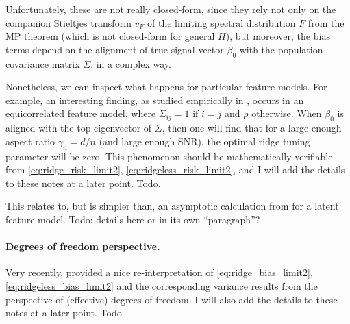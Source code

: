 \documentclass{article}
\begin{document}
Unfortunately, these are not really closed-form, since they rely not only on the
companion Stieltjes transform $v_F$ of the limiting spectral distribution $F$
from the MP theorem (which is not closed-form for general $H$), but moreover,
the bias terms depend on the alignment of true signal vector $\beta_0$ with the
population covariance matrix $\Sigma$, in a complex way.  

Nonetheless, we can inspect what happens for particular feature models. For
example, an interesting finding, as studied empirically in
\citet{kobak2020optimal}, occurs in an equicorrelated feature model, where
$\Sigma_{ij} = 1$ if $i=j$ and $\rho$ otherwise. When $\beta_0$ is aligned with  
the top eigenvector of $\Sigma$, then one will find that for a large enough
aspect ratio $\gamma_n = d/n$ (and large enough SNR), the optimal ridge tuning
parameter will be zero. This phenomenon should be mathematically verifiable from 
\eqref{eq:ridge_risk_limit2}, \eqref{eq:ridgeless_risk_limit2}, and I will add
the details to these notes at a later point. Todo.

This relates to, but is simpler than, an asymptotic calculation from
\citet{hastie2022surprises} for a latent feature model. Todo: details here or in
its own ``paragraph''?

\paragraph{Degrees of freedom perspective.}

Very recently, \citet{bach2023high} provided a nice re-interpretation of
\eqref{eq:ridge_bias_limit2}, \eqref{eq:ridgeless_bias_limit2} and the
corresponding variance results from the perspective of (effective) degrees of
freedom. I will also add the details to these notes at a later point. Todo.



\end{document}
